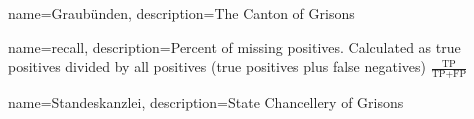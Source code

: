 \makenoidxglossaries

{
    name=Graubünden,
    description={The Canton of Grisons}
}

{
    name=recall,
    description={Percent of missing positives. 
    Calculated as true positives divided by all positives (true positives plus false negatives) $\frac{\text{TP}}{\text{TP}+\text{FP}}$}
}

{
    name=Standeskanzlei,
    description={State Chancellery of Grisons}
}



